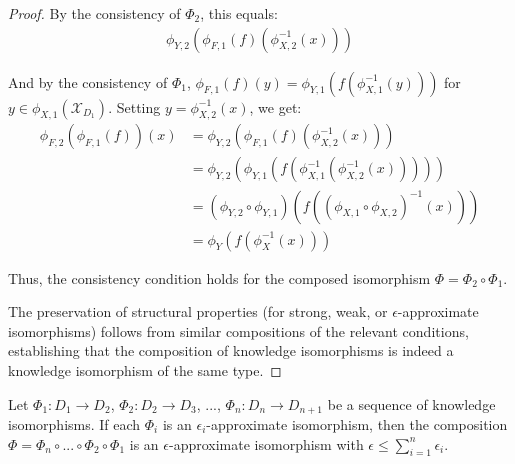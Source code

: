 \begin{proof}
By the consistency of $\Phi_2$, this equals:
\begin{align}
\phi_{Y,2}(\phi_{F,1}(f)(\phi_{X,2}^{-1}(x)))
\end{align}

And by the consistency of $\Phi_1$, $\phi_{F,1}(f)(y) = \phi_{Y,1}(f(\phi_{X,1}^{-1}(y)))$ for $y \in \phi_{X,1}(\mathcal{X}_{D_1})$. Setting $y = \phi_{X,2}^{-1}(x)$, we get:
\begin{align}
\phi_{F,2}(\phi_{F,1}(f))(x) &= \phi_{Y,2}(\phi_{F,1}(f)(\phi_{X,2}^{-1}(x))) \\
&= \phi_{Y,2}(\phi_{Y,1}(f(\phi_{X,1}^{-1}(\phi_{X,2}^{-1}(x))))) \\
&= (\phi_{Y,2} \circ \phi_{Y,1})(f((\phi_{X,1} \circ \phi_{X,2})^{-1}(x))) \\
&= \phi_Y(f(\phi_X^{-1}(x)))
\end{align}

Thus, the consistency condition holds for the composed isomorphism $\Phi = \Phi_2 \circ \Phi_1$.

The preservation of structural properties (for strong, weak, or $\epsilon$-approximate isomorphisms) follows from similar compositions of the relevant conditions, establishing that the composition of knowledge isomorphisms is indeed a knowledge isomorphism of the same type.
\end{proof}

\begin{theorem}
Let $\Phi_1: D_1 \to D_2$, $\Phi_2: D_2 \to D_3$, ..., $\Phi_n: D_n \to D_{n+1}$ be a sequence of knowledge isomorphisms. If each $\Phi_i$ is an $\epsilon_i$-approximate isomorphism, then the composition $\Phi = \Phi_n \circ ... \circ \Phi_2 \circ \Phi_1$ is an $\epsilon$-approximate isomorphism with $\epsilon \leq \sum_{i=1}^n \epsilon_i$.
\end{theorem}

